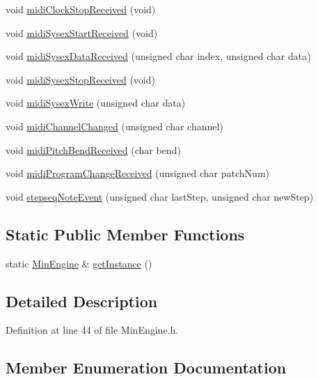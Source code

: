\begin{DoxyCompactItemize}
\item 
void \hyperlink{class_min_engine_a08ac0328006e01f44ffbb3c78f4f504a}{midi\+Clock\+Stop\+Received} (void)
\item 
void \hyperlink{class_min_engine_a79e4c141d7f6df522e5307195c8aeec0}{midi\+Sysex\+Start\+Received} (void)
\item 
void \hyperlink{class_min_engine_ac424a71b7b8e28ce4e6cd47bda488704}{midi\+Sysex\+Data\+Received} (unsigned char index, unsigned char data)
\item 
void \hyperlink{class_min_engine_a1378bc2f4ad5d072392a498f5ef9e8e8}{midi\+Sysex\+Stop\+Received} (void)
\item 
void \hyperlink{class_min_engine_a10593d7e2c9bc02a3cffa92a522da294}{midi\+Sysex\+Write} (unsigned char data)
\item 
void \hyperlink{class_min_engine_a5a88234cb86802788fd959d58efc9563}{midi\+Channel\+Changed} (unsigned char channel)
\item 
void \hyperlink{class_min_engine_a5b0f6a252cc4958e81d8989872105544}{midi\+Pitch\+Bend\+Received} (char bend)
\item 
void \hyperlink{class_min_engine_a0e772deba3710b21ef14f7a72994edb1}{midi\+Program\+Change\+Received} (unsigned char patch\+Num)
\item 
void \hyperlink{class_min_engine_a46ab2a887b8c83c9b484304778bc01a1}{stepseq\+Note\+Event} (unsigned char last\+Step, unsigned char new\+Step)
\end{DoxyCompactItemize}
\subsection*{Static Public Member Functions}
\begin{DoxyCompactItemize}
\item 
static \hyperlink{class_min_engine}{Min\+Engine} \& \hyperlink{class_min_engine_a1af3fc41e2660fff51bbab55a09951ec}{get\+Instance} ()
\end{DoxyCompactItemize}


\subsection{Detailed Description}


Definition at line 44 of file Min\+Engine.\+h.



\subsection{Member Enumeration Documentation}
\mbox{\label{class_min_engine_a78331ae304f5e8f09753947c82a95fbd}} 
